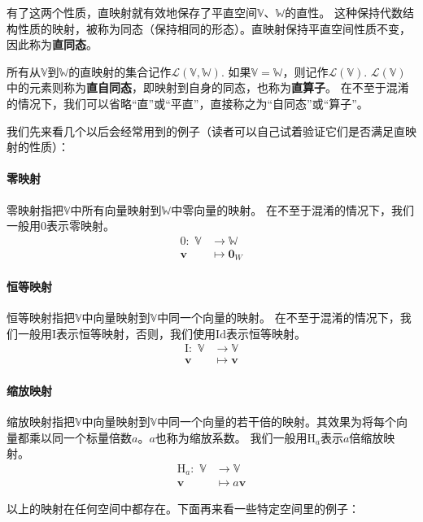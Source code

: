 \documentclass[12pt,UTF8,fontset=none]{ctexbook}
\begin{document}
有了这两个性质，直映射就有效地保存了平直空间$\mathbb{V}$、$\mathbb{W}$的直性。
这种保持代数结构性质的映射，被称为同态（保持相同的形态）。直映射保持平直空间性质不变，因此称为\textbf{直同态}。

所有从$\mathbb{V}$到$\mathbb{W}$的直映射的集合记作$\mathcal{L}(\mathbb{V},\mathbb{W})$.
如果$\mathbb{V} = \mathbb{W}$，则记作$\mathcal{L}(\mathbb{V})$.  
$\mathcal{L}(\mathbb{V})$中的元素则称为\textbf{直自同态}，即映射到自身的同态，也称为\textbf{直算子}。
在不至于混淆的情况下，我们可以省略“直”或“平直”，直接称之为“自同态”或“算子”。

我们先来看几个以后会经常用到的例子（读者可以自己试着验证它们是否满足直映射的性质）：

\paragraph{零映射} 零映射指把$\mathbb{V}$中所有向量映射到$\mathbb{W}$中零向量的映射。
在不至于混淆的情况下，我们一般用$\mathrm{0}$表示零映射。
\begin{align*}
    \mathrm{0}: \,\, \mathbb{V} & \to \mathbb{W}  \\
    \mathbf{v} & \mapsto \mathbf{0}_W 
\end{align*}

\paragraph{恒等映射} 恒等映射指把$\mathbb{V}$中向量映射到$\mathbb{V}$中同一个向量的映射。
在不至于混淆的情况下，我们一般用$\mathrm{I}$表示恒等映射，否则，我们使用$\mathrm{Id}$表示恒等映射。
\begin{align*}
    \mathrm{I}: \,\, \mathbb{V} & \to \mathbb{V}  \\
    \mathbf{v} & \mapsto \mathbf{v} 
\end{align*}

\paragraph{缩放映射}
缩放映射指把$\mathbb{V}$中向量映射到$\mathbb{V}$中同一个向量的若干倍的映射。其效果为将每个向量都乘以同一个标量倍数$a$。$a$也称为缩放系数。
我们一般用$\mathrm{H}_a$表示$a$倍缩放映射。
\begin{align*}
    \mathrm{H}_a: \,\, \mathbb{V} & \to \mathbb{V}  \\
    \mathbf{v} & \mapsto a\mathbf{v} 
\end{align*}

以上的映射在任何空间中都存在。下面再来看一些特定空间里的例子：
\end{document}
